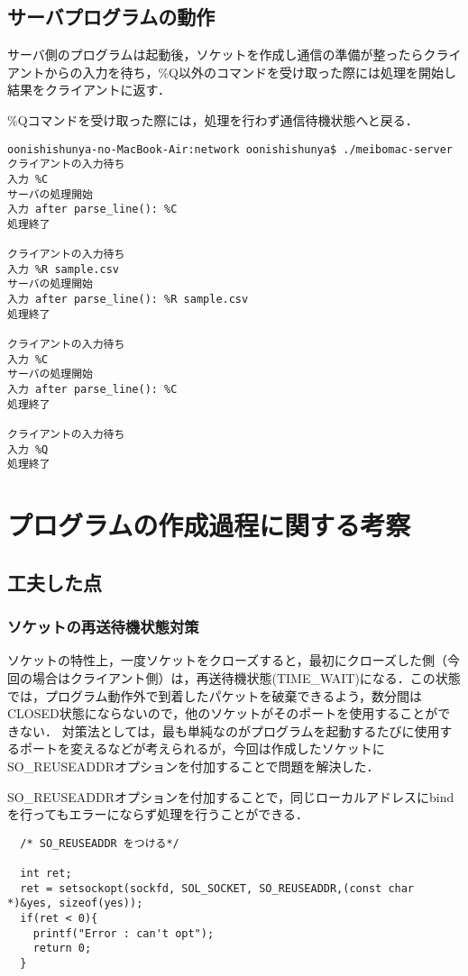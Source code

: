 \documentclass[a4j]{jarticle}
\begin{document}
\subsection{サーバプログラムの動作}
サーバ側のプログラムは起動後，ソケットを作成し通信の準備が整ったらクライアントからの入力を待ち，\%Q以外のコマンドを受け取った際には処理を開始し結果をクライアントに返す．

\%Qコマンドを受け取った際には，処理を行わず通信待機状態へと戻る．
\begin{verbatim}
oonishishunya-no-MacBook-Air:network oonishishunya$ ./meibomac-server 
クライアントの入力待ち 
入力 %C
サーバの処理開始 
入力 after parse_line(): %C
処理終了

クライアントの入力待ち 
入力 %R sample.csv
サーバの処理開始 
入力 after parse_line(): %R sample.csv
処理終了

クライアントの入力待ち 
入力 %C
サーバの処理開始 
入力 after parse_line(): %C
処理終了

クライアントの入力待ち 
入力 %Q
処理終了
\end{verbatim}
\section{プログラムの作成過程に関する考察}

\subsection{工夫した点}
\subsubsection{ソケットの再送待機状態対策}
ソケットの特性上，一度ソケットをクローズすると，最初にクローズした側（今回の場合はクライアント側）は，再送待機状態(TIME\_WAIT)になる．この状態では，プログラム動作外で到着したパケットを破棄できるよう，数分間はCLOSED状態にならないので，他のソケットがそのポートを使用することができない．
対策法としては，最も単純なのがプログラムを起動するたびに使用するポートを変えるなどが考えられるが，今回は作成したソケットにSO\_REUSEADDRオプションを付加することで問題を解決した．

SO\_REUSEADDRオプションを付加することで，同じローカルアドレスにbindを行ってもエラーにならず処理を行うことができる．

\begin{verbatim}
  /* SO_REUSEADDR をつける*/

  int ret;
  ret = setsockopt(sockfd, SOL_SOCKET, SO_REUSEADDR,(const char *)&yes, sizeof(yes));
  if(ret < 0){
    printf("Error : can't opt");
    return 0;
  }
\end{verbatim}
\end{document}
